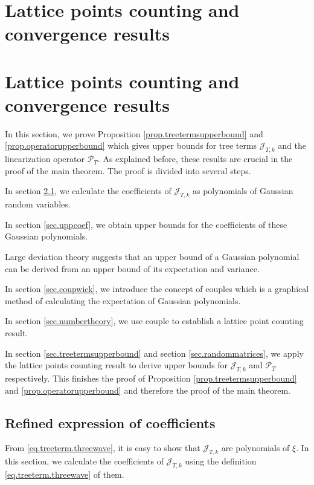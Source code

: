 \section{Lattice points counting and convergence results}

\section{Lattice points counting and convergence results}
In this section, we prove Proposition \ref{prop.treetermsupperbound} and \ref{prop.operatorupperbound} which gives upper bounds for tree terms $\mathcal{J}_{T,k}$ and the linearization operator $\mathcal{P}_T$. As explained before, these results are crucial in the proof of the main theorem. The proof is divided into several steps.

In section \ref{sec.refexp}, we calculate the coefficients of $\mathcal{J}_{T,k}$ as polynomials of Gaussian random variables.

In section \ref{sec.uppcoef}, we obtain upper bounds for the coefficients of these Gaussian polynomials.

Large deviation theory suggests that an upper bound of a Gaussian polynomial can be derived from an upper bound of its expectation and variance.

In section \ref{sec.coupwick}, we introduce the concept of couples which is a graphical method of calculating the expectation of Gaussian polynomials.

In section \ref{sec.numbertheory}, we use couple to establish a lattice point counting result.

In section \ref{sec.treetermsupperbound} and section \ref{sec.randommatrices}, we apply the lattice points counting result to derive upper bounds for  $\mathcal{J}_{T,k}$ and $\mathcal{P}_T$ respectively. This finishes the proof of Proposition \ref{prop.treetermsupperbound} and \ref{prop.operatorupperbound} and therefore the proof of the main theorem.


\subsection{Refined expression of coefficients}\label{sec.refexp} From \eqref{eq.treeterm.threewave}, it is easy to show that $\mathcal{J}_{T,k}$ are polynomials of $\xi$. In this section, we calculate the coefficients of $\mathcal{J}_{T,k}$ using the definition \eqref{eq.treeterm.threewave} of them.

